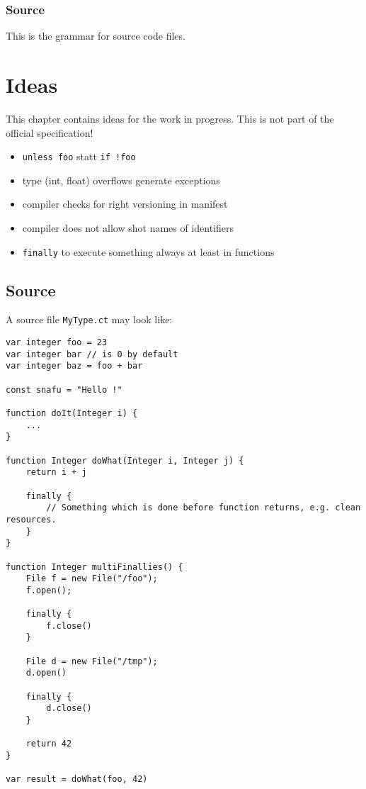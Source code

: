 \documentclass[11pt,a4paper]{report}
\begin{document}
\subsection{Source}

This is the grammar for source code files.



\chapter{Ideas}


This chapter contains ideas for the work in progress. This is not part of the official specification!

\begin{itemize}
    \item \texttt{unless foo} statt \texttt{if !foo}
    \item type (int, float) overflows generate exceptions
    \item compiler checks for right versioning in manifest
    \item compiler does not allow shot names of identifiers
    \item \texttt{finally} to execute something always at least in functions
\end{itemize}

\section{Source}

A source file \texttt{MyType.ct} may look like:

\begin{lstlisting}[language=CayThe]
var integer foo = 23
var integer bar // is 0 by default
var integer baz = foo + bar

const snafu = "Hello !"

function doIt(Integer i) {
    ...
}

function Integer doWhat(Integer i, Integer j) {
    return i + j
    
    finally {
        // Something which is done before function returns, e.g. clean resources.
    }
}

function Integer multiFinallies() {
    File f = new File("/foo");
    f.open();

    finally {
        f.close()
    }

    File d = new File("/tmp");
    d.open()

    finally {
        d.close()
    }

    return 42
}

var result = doWhat(foo, 42)	
\end{lstlisting}
\end{document}
